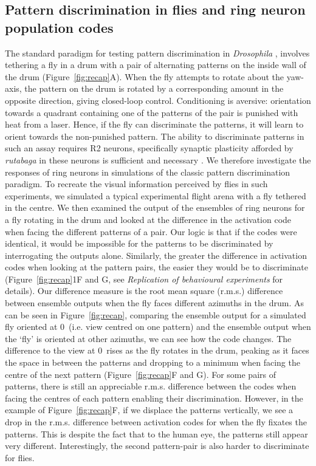 \documentclass[10pt]{article}
\begin{document}
\subsection*{Pattern discrimination in flies and ring neuron population codes}
The standard paradigm for testing pattern discrimination in \emph{Drosophila} \cite{Pan2009,Liu2006,Ernst1999,Dill1993}, involves tethering a fly in a drum with a pair of alternating patterns on the inside wall of the drum (Figure~\ref{fig:recap}A). When the fly attempts to rotate about the yaw-axis, the pattern on the drum is rotated by a corresponding amount in the opposite direction, giving closed-loop control. Conditioning is aversive: orientation towards a quadrant containing one of the patterns of the pair is punished with heat from a laser. Hence, if the fly can discriminate the patterns, it will learn to orient towards the non-punished pattern. The ability to discriminate patterns in such an assay requires R2 neurons, specifically synaptic plasticity afforded by \emph{rutabaga} in these neurons is sufficient and necessary \cite{Pan2009,Wang2008,Liu2006,Ernst1999}. We therefore investigate the responses of ring neurons in simulations of the classic pattern discrimination paradigm. 
To recreate the visual information perceived by flies in such experiments, we simulated a typical experimental flight arena with a fly tethered in the centre. We then examined the output of the ensembles of ring neurons for a fly rotating in the drum and looked at the difference in the activation code when facing the different patterns of a pair. Our logic is that if the codes were identical, it would be impossible for the patterns to be discriminated by interrogating the outputs alone. Similarly, the greater the difference in activation codes when looking at the pattern pairs, the easier they would be to discriminate (Figure~\ref{fig:recap}1F and G, see \emph{Replication of behavioural experiments} for details). Our difference measure is the root mean square (r.m.s.) difference between ensemble outputs when the fly faces different azimuths in the drum. As can be seen in Figure~\ref{fig:recap}, comparing the ensemble output for a simulated fly oriented at 0\degree\ (i.e. view centred on one pattern) and the ensemble output when the ‘fly’ is oriented at other azimuths, we can see how the code changes. The difference to the view at 0\degree\ rises as the fly rotates in the drum, peaking as it faces the space in between the patterns and dropping to a minimum when facing the centre of the next pattern (Figure~\ref{fig:recap}F and G). For some pairs of patterns, there is still an appreciable r.m.s. difference between the codes when facing the centres of each pattern enabling their discrimination. However, in the example of Figure~\ref{fig:recap}F, if we displace the patterns vertically, we see a drop in the r.m.s. difference between activation codes for when the fly fixates the patterns. This is despite the fact that to the human eye, the patterns still appear very different. Interestingly, the second pattern-pair is also harder to discriminate for flies. 
\end{document}
